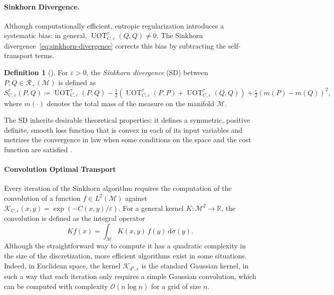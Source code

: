 \documentclass{article}
\theoremstyle{plain}
\theoremstyle{definition}
\newtheorem{definition}[theorem]{Definition}
\theoremstyle{remark}
\newcommand{\M}{\ensuremath{\mathcal{M}}}
\begin{document}
\paragraph{Sinkhorn Divergence.}

Although computationally efficient, entropic regularization introduces a systematic bias: in general, $\operatorname{UOT}_{C,\varepsilon}^{\tau}(Q,Q) \neq 0$. The Sinkhorn divergence~\eqref{eq:sinkhorn-divergence} corrects this bias by subtracting the self-transport terms.

\begin{definition}[\cite{sejourne2019sinkhorn}]
For $\varepsilon > 0$, the \emph{Sinkhorn divergence} (SD) between $P, Q \in \mathcal{R}_+(\M)$ is defined as
\begin{equation}
\label{eq:sinkhorn-divergence}
S_{C,\varepsilon}^{\tau}(P,Q)
\coloneqq \operatorname{UOT}_{C,\varepsilon}^{\tau}(P,Q)
- \tfrac{1}{2}\left(\operatorname{UOT}_{C,\varepsilon}^{\tau}(P,P)
+\operatorname{UOT}_{C,\varepsilon}^{\tau}(Q,Q)\right) + \tfrac{\varepsilon}{2}(m(P)-m(Q))^2,
\end{equation}
where $m(\cdot)$ denotes the total mass of the measure on the manifold $\M$.
\end{definition}

The SD inherits desirable theoretical properties: it defines a symmetric, positive definite, smooth loss function that is convex in each of its input variables and metrizes the convergence in law when some conditions on the space and the cost function are satisfied \cite[Theorem 5 \& 6]{sejourne2019sinkhorn}.

\paragraph{Convolution Optimal Transport} Every iteration of the Sinkhorn algorithm requires the computation of the convolution of a function $f\in L^2(\M)$ against $\mathcal{K}_{C,\varepsilon}(x,y) = \exp(-C(x,y)/\varepsilon)$. For a general kernel $K:\M^2\to\mathbb{R}$, the convolution is defined as the integral operator
\begin{equation}\label{eq:kernel-conv}
  Kf(x) = \int_\mathcal{M} K(x,y)\, f(y)\,\mathrm{d}\sigma(y).
\end{equation}
Although the straightforward way to compute it has a quadratic complexity in the size of the discretization, more efficient algorithms exist in some situations. Indeed, in Euclidean space, the kernel $\mathcal{K}_{d^2,\varepsilon}$ is the standard Gaussian kernel, in such a way that each iteration only requires a simple Gaussian convolution, which can be computed with complexity $\mathcal{O}(n\log n)$ for a grid of size $n$.
\end{document}
